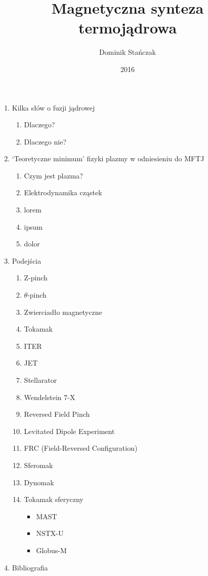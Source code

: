\documentclass{article}
\begin{document}
\title{Magnetyczna synteza termojądrowa}
\author{Dominik Stańczak}
\date{2016}

\maketitle
\begin{enumerate}
    \item Kilka słów o fuzji jądrowej
    \begin{enumerate}
        \item Dlaczego?
        \item Dlaczego nie?
    \end{enumerate}
    \item `Teoretyczne minimum' fizyki plazmy w odniesieniu do MFTJ
    \begin{enumerate}
        \item Czym jest plazma?
        \item Elektrodynamika cząstek
        \item lorem
        \item ipsum
        \item dolor
    \end{enumerate}
    \item Podejścia
    \begin{enumerate}
        \item Z-pinch
        \item $\theta$-pinch
        \item Zwierciadło magnetyczne
        \item Tokamak
            \item ITER
            \item JET
        \item Stellarator
            \item Wendelstein 7-X
        \item Reversed Field Pinch
        \item Levitated Dipole Experiment
        \item FRC (Field-Reversed Configuration)
        \item Sferomak
        \item Dynomak
        \item Tokamak sferyczny
        \begin{itemize}
            \item MAST
            \item NSTX-U
            \item Globus-M
        \end{itemize}
    \end{enumerate}
    \item Bibliografia
\end{enumerate}
\end{document}
